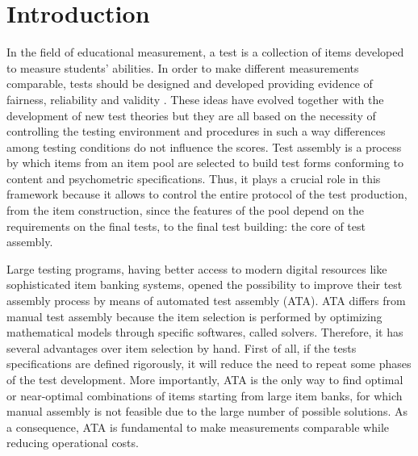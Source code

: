 
\chapter{Introduction} %

\label{Introduction2} %


\newcommand{\keyword}[1]{\textbf{#1}}
\newcommand{\tabhead}[1]{\textbf{#1}}
\newcommand{\code}[1]{\texttt{#1}}
\newcommand{\file}[1]{\texttt{\bfseries#1}}
\newcommand{\option}[1]{\texttt{\itshape#1}}

In the field of educational measurement, a test is a collection of items developed to measure students' abilities.
In order to make different measurements comparable, tests should be designed and developed providing evidence of fairness, reliability and validity \parencite{AERA2014}.
These ideas have evolved together with the development of new test theories but they are all based on the necessity of controlling the testing environment and procedures in such a way differences among testing conditions do not influence the scores.
Test assembly is a process by which items from an item pool are selected to build test forms conforming to content and psychometric specifications.
Thus, it plays a crucial role in this framework because it allows to control the entire protocol of the test production, from the item construction, since the features of the pool depend on the requirements on the final tests, to the final test building: the core of test assembly. 

Large testing programs, having better access to modern digital resources like sophisticated item banking systems, opened the possibility to improve their test assembly process by means of automated test assembly (ATA).
ATA differs from manual test assembly because the item selection is performed by optimizing mathematical models through specific softwares, called solvers.
Therefore, it has several advantages over item selection by hand.
First of all, if the tests specifications are defined rigorously, it will reduce the need to repeat some phases of the test development.
More importantly, ATA is the only way to find optimal or near-optimal combinations of items starting from large item banks, for which manual assembly is not feasible due to the large number of possible solutions.
As a consequence, ATA is fundamental to make measurements comparable while reducing operational costs. 

